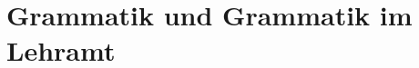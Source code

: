 \documentclass[handout,aspectratio=1610,dvipsnames]{beamer}
\begin{document}
  \section{Grammatik und Grammatik im Lehramt}
  \let\woopsi\section\let\section\subsection\let\subsection\subsubsection
  
  \let\subsection\section\let\section\woopsi
\end{document}
